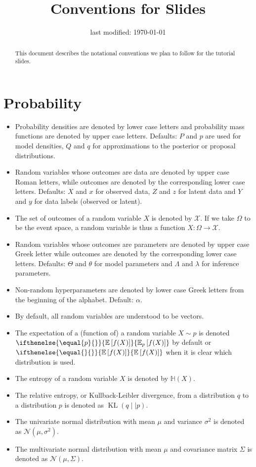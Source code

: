 \documentclass[14pt,a4paper]{article}
\author{}
\title{Conventions for Slides}
\date{last modified: \today}
\DeclareMathOperator{\KullbackLeibler}{KL}
\newcommand{\E}[2][]{\ifthenelse{\equal{#1}{}}{\mathbb{E}\left[#2\right]}{\mathbb{E}_{#1}\left[#2\right]}}
\newcommand{\Ent}[1]{\mathbb{H}\left(#1\right)}
\newcommand{\KL}[2]{\KullbackLeibler\left(#1\mid\mid #2\right)}
\newcommand{\NDist}[2]{\mathcal{N}\left(#1,#2\right)}
\begin{document}
\begin{abstract}
This document describes the notational conventions we plan to follow for the tutorial slides. 
\end{abstract}

\section{Probability}
\begin{itemize}
\item Probability densities are denoted by lower case letters and probability mass functions are denoted by upper case letters. Defaults: $ P $ and $ p $ are used for model densities, $ Q $ and $ q $ for approximations to the
posterior or proposal distributions.
\item Random variables whose outcomes are data are denoted by upper case Roman letters, while outcomes are denoted by the corresponding lower case letters. Defaults: $ X $ and $ x $ for observed data, $ Z $ and $ z $
for latent data and $ Y $ and $ y $ for data labels (observed or latent).
\item The set of outcomes of a random variable $ X $ is denoted by $ \mathcal{X} $. If we take $ \Omega $
to be the event space, a random variable is thus a function $ X : \Omega \rightarrow \mathcal{X} $.
\item Random variables whose outcomes are parameters are denoted by upper case Greek letter while outcomes
are denoted by the corresponding lower case letters. Defaults: $ \Theta $ and $ \theta $ for model parameters
and $ \Lambda $ and $ \lambda $ for inference parameters.
\item Non-random hyperparameters are denoted by lower case Greek letters from the beginning of the alphabet.
Default: $ \alpha $.
\item By default, all random variables are understood to be vectors.
\item The expectation of a (function of) a random variable $ X \sim p $ is denoted $ \E[p]{f(X)} $ by default
or $ \E{f(X)} $ when it is clear which distribution is used.
\item The entropy of a random variable $ X $ is denoted by $ \Ent{X} $.
\item The relative entropy, or Kullback-Leibler divergence, from a distribution $ q $ to a distribution $ p $ 
is denoted as $ \KL{q}{p} $.
\item The univariate normal distribution with mean $ \mu $ and variance $ \sigma^{2} $ is denoted as 
$ \NDist{\mu}{\sigma^{2}} $.
\item The multivariate normal distribution with mean $ \mu $ and covariance matrix $ \Sigma $ is denoted as
$ \NDist{\mu}{\Sigma} $.
\end{itemize}
\end{document}
